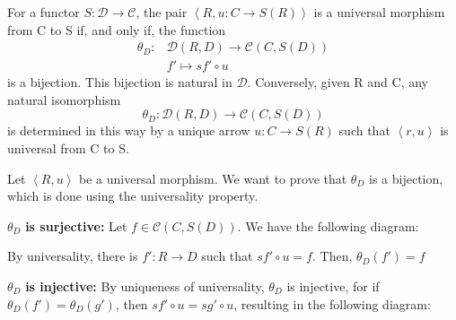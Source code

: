 \documentclass[../category_theory.tex]{subfiles}
\begin{document}
\begin{prop*}
	For a functor \(S:\mathcal{D}\rightarrow \mathcal{C}\), the pair \(\left< R, u:C\rightarrow S(R) \right>\) is a universal morphism from C to S if, and only if, the function
	\begin{align*}
		\theta_{D}: & \mathcal{D}(R, D)\rightarrow \mathcal{C}(C, S(D)) \\
		            & f'\mapsto sf'\circ u
	\end{align*}
	is a bijection. This bijection is natural in \(\mathcal{D}\). Conversely, given R and C, any natural isomorphism
	\[
		\theta_{D}:\mathcal{D}(R, D)\rightarrow \mathcal{C}(C, S(D))
	\]
	is determined in this way by a unique arrow \(u:C\rightarrow S(R)\) such that \(\left< r, u \right>\) is universal from C to S.
\end{prop*}
\begin{proof*}
	Let \(\left< R, u \right>\) be a universal morphism. We want to prove that \(\theta_{D}\) is a bijection, which is done using the universality property.

	\(\theta_{D}\) \textbf{is surjective:} Let \(f\in \mathcal{C}(C, S(D))\). We have the following diagram:
	\begin{center}
	\end{center}
	By universality, there is \(f':R\rightarrow D\) such that \(sf'\circ u=f.\) Then, \(\theta_{D}(f')=f\)

	\(\theta_{D}\) \textbf{is injective:} By uniqueness of universality, \(\theta_{D}\) is injective, for if \(\theta_{D}(f')=\theta_{D}(g')\), then \(sf'\circ u = sg'\circ u\), resulting in the following diagram:


\end{proof*}
\end{document}
